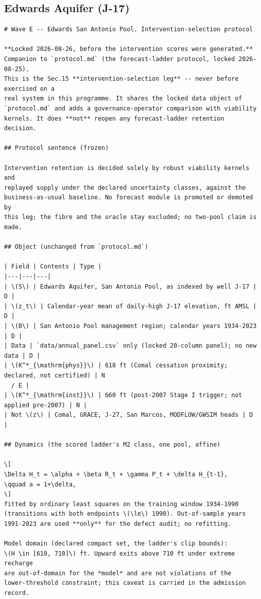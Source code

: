 \documentclass[11pt,a4paper]{article}
\begin{document}
\subsection{Edwards Aquifer (J-17)}
\begin{footnotesize}\begin{verbatim}
# Wave E -- Edwards San Antonio Pool. Intervention-selection protocol

**Locked 2026-08-26, before the intervention scores were generated.**
Companion to `protocol.md` (the forecast-ladder protocol, locked 2026-08-25).
This is the Sec.15 **intervention-selection leg** -- never before exercised on a
real system in this programme. It shares the locked data object of
`protocol.md` and adds a governance-operator comparison with viability
kernels. It does **not** reopen any forecast-ladder retention decision.

## Protocol sentence (frozen)

Intervention retention is decided solely by robust viability kernels and
replayed supply under the declared uncertainty classes, against the
business-as-usual baseline. No forecast module is promoted or demoted by
this leg; the fibre and the oracle stay excluded; no two-pool claim is made.

## Object (unchanged from `protocol.md`)

| Field | Contents | Type |
|---|---|---|
| \(S\) | Edwards Aquifer, San Antonio Pool, as indexed by well J-17 | D |
| \(z_t\) | Calendar-year mean of daily-high J-17 elevation, ft AMSL | D |
| \(B\) | San Antonio Pool management region; calendar years 1934-2023 | D |
| Data | `data/annual_panel.csv` only (locked 20-column panel); no new data | D |
| \(K^*_{\mathrm{phys}}\) | 618 ft (Comal cessation proximity; declared, not certified) | N
  / E |
| \(K^*_{\mathrm{inst}}\) | 660 ft (post-2007 Stage I trigger; not applied pre-2007) | N |
| Not \(z\) | Comal, GRACE, J-27, San Marcos, MODFLOW/GWSIM heads | D |

## Dynamics (the scored ladder's M2 class, one pool, affine)

\[
\Delta H_t = \alpha + \beta R_t + \gamma P_t + \delta H_{t-1},
\qquad a = 1+\delta,
\]
fitted by ordinary least squares on the training window 1934-1990
(transitions with both endpoints \(\le\) 1990). Out-of-sample years
1991-2023 are used **only** for the defect audit; no refitting.

Model domain (declared compact set, the ladder's clip bounds):
\(H \in [610, 710]\) ft. Upward exits above 710 ft under extreme recharge
are out-of-domain for the *model* and are not violations of the
lower-threshold constraint; this caveat is carried in the admission record.


\end{verbatim}
\end{footnotesize}
\end{document}
